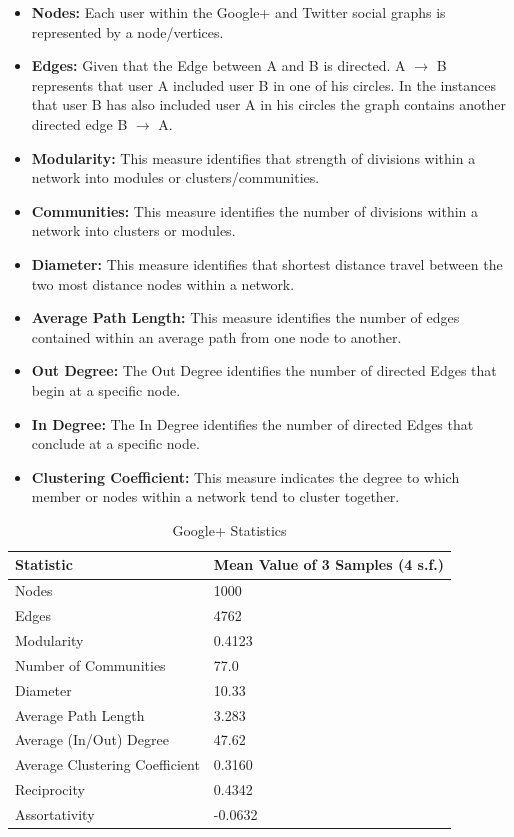 \documentclass[a4paper, 10pt, conference]{ieeeconf}      %
\begin{document}
\begin{itemize}
\item \textbf{Nodes:} Each user within the Google+ and Twitter social graphs is represented by a node/vertices. 
\item \textbf{Edges:} Given that the Edge between A and B is directed. A $\rightarrow$ B represents that user A included user B in one of his circles. In the instances that  user B has also included user A in his circles the graph contains another directed edge B $\rightarrow$ A.
\item \textbf{Modularity:} This measure identifies that strength of divisions within a network into modules or clusters/communities.
\item \textbf{Communities:} This measure identifies the number of divisions within a network into clusters or modules.
\item \textbf{Diameter:} This measure identifies that shortest distance travel between the two most distance nodes within a network. 
\item \textbf{Average Path Length:} This measure identifies the number of edges contained within an average path from one node to another.
\item \textbf{Out Degree:} The Out Degree identifies the number of directed Edges that begin at a specific node.
\item \textbf{In Degree:} The In Degree identifies the number of directed Edges that conclude at a specific node.
\item \textbf{Clustering Coefficient:} This measure indicates the degree to which member or nodes within a network tend to cluster together.
\end{itemize}

\begin{table}[htb]
\caption{Google+ Statistics}
\label{table_google}
\begin{center}
\begin{tabular}{ | l | l | } 
\hline
\textbf{Statistic} & \textbf{Mean Value of 3 Samples (4 s.f.)}\\
\hline
Nodes & 1000\\
Edges & 4762\\
Modularity & 0.4123\\
Number of Communities & 77.0\\
Diameter & 10.33\\
Average Path Length & 3.283\\
Average (In/Out) Degree & 47.62\\
Average Clustering Coefficient & 0.3160\\
Reciprocity & 0.4342\\
Assortativity & -0.0632\\
\hline
\end{tabular}
\end{center}
\end{table}
\end{document}
